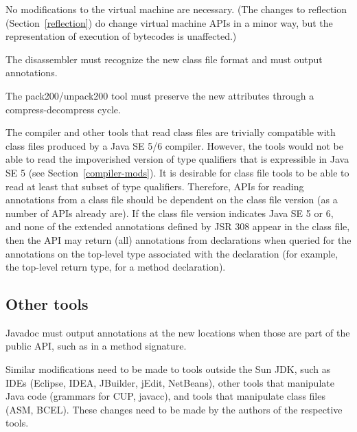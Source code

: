 \documentclass[10pt]{article}
\begin{document}
No modifications to the virtual machine are necessary.
(The changes to reflection (Section~\ref{reflection}) do change virtual
machine APIs in a minor way, but the representation of execution of
bytecodes is unaffected.)

The  disassembler must recognize the new class
file format and must output annotations.

The pack200/unpack200 tool must preserve the new attributes through a
compress-decompress cycle.


The compiler and other tools that read class files are trivially compatible
with class files produced by a Java SE 5/6 compiler.  However, the tools
would not be able to read the impoverished version of type qualifiers that
is expressible in Java SE 5 (see Section~\ref{compiler-mods}).  It is
desirable for class file tools to be able to read at least that subset of
type qualifiers.  Therefore, APIs for reading annotations from a class file
should be dependent on the class file version (as a number of APIs already
are).  If the class file version indicates Java SE 5 or 6, and none of the
extended annotations defined by JSR 308 appear in the class file, then the
API may return (all) annotations from declarations when queried for the
annotations on the top-level type associated with the declaration (for
example, the top-level return type, for a method declaration).


\subsection{Other tools\label{other-tools}}

Javadoc must output annotations at the new locations when those are part
of the public API, such as in a
method signature.


Similar modifications need to be made to tools outside the Sun JDK,
such as IDEs (Eclipse, IDEA, JBuilder, jEdit, NetBeans), other tools that
manipulate Java code (grammars for CUP, javacc), and tools that
manipulate class files (ASM, BCEL\@).  These changes need to be made by the
authors of the respective tools.
\end{document}
